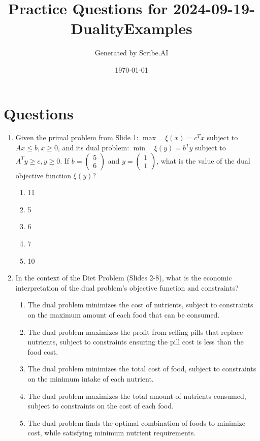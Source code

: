 \documentclass{article}%
\title{Practice Questions for 2024{-}09{-}19{-}DualityExamples}%
\author{Generated by Scribe.AI}%
\date{\today}%
\begin{document}
%
\normalsize%
\maketitle%
\section{Questions}%
\label{sec:Questions}%
\begin{enumerate}%
\item Given the primal problem from Slide 1: $\max \quad \xi(x) = c^T x$ subject to $Ax \le b, x \ge 0$, and its dual problem: $\min \quad \xi(y) = b^T y$ subject to $A^T y \ge c, y \ge 0$. If $b = \begin{pmatrix} 5 \\ 6 \end{pmatrix}$ and $y = \begin{pmatrix} 1 \\ 1 \end{pmatrix}$, what is the value of the dual objective function $\xi(y)$?%
\begin{enumerate}%
\item 11%
\item 5%
\item 6%
\item 7%
\item 10%
\end{enumerate}%
\vspace{1em}%
\item In the context of the Diet Problem (Slides 2-8), what is the economic interpretation of the dual problem's objective function and constraints?%
\begin{enumerate}%
\item The dual problem minimizes the cost of nutrients, subject to constraints on the maximum amount of each food that can be consumed.%
\item The dual problem maximizes the profit from selling pills that replace nutrients, subject to constraints ensuring the pill cost is less than the food cost.%
\item The dual problem minimizes the total cost of food, subject to constraints on the minimum intake of each nutrient.%
\item The dual problem maximizes the total amount of nutrients consumed, subject to constraints on the cost of each food.%
\item The dual problem finds the optimal combination of foods to minimize cost, while satisfying minimum nutrient requirements.%

\end{enumerate}
\end{enumerate}
\end{document}

